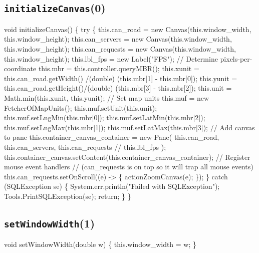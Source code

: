 \subsection{\texttt{initializeCanvas}(0)}
\nwenddocs{}\endmoddef{}
void initializeCanvas() \{
  try \{
    this.can_road     = new Canvas(this.window_width, this.window_height);
    this.can_servers  = new Canvas(this.window_width, this.window_height);
    this.can_requests = new Canvas(this.window_width, this.window_height);
    this.lbl_fps      = new Label("FPS");
    // Determine pixels-per-coordinate
    this.mbr   = this.controller.queryMBR();
    this.xunit = this.can_road.getWidth() /(double) (this.mbr[1] - this.mbr[0]);
    this.yunit = this.can_road.getHeight()/(double) (this.mbr[3] - this.mbr[2]);
    this.unit  = Math.min(this.xunit, this.yunit);
    // Set map units
    this.muf = new FetcherOfMapUnits();
    this.muf.setUnit(this.unit);
    this.muf.setLngMin(this.mbr[0]);
    this.muf.setLatMin(this.mbr[2]);
    this.muf.setLngMax(this.mbr[1]);
    this.muf.setLatMax(this.mbr[3]);
    // Add canvas to pane
    this.container_canvas_container = new Pane(
        this.can_road,
        this.can_servers,
        this.can_requests
//        this.lbl_fps
    );
    this.container_canvas.setContent(this.container_canvas_container);
    // Register mouse event handlers
    // (can_requests is on top so it will trap all mouse events)
    this.can_requests.setOnScroll((e) -> \{ actionZoomCanvas(e); \});
  \} catch (SQLException se) \{
    System.err.println("Failed with SQLException");
    Tools.PrintSQLException(se);
    return;
  \}
\}
\eatline
{}\nwendcode{}\nwdocspar
\subsection{\texttt{setWindowWidth}(1)}
\nwenddocs{}\endmoddef{}
void setWindowWidth(double w) \{
  this.window_width = w;
\}
\eatline
{}\nwendcode{}\nwdocspar
